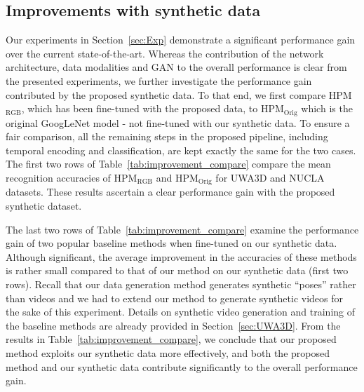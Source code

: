 \documentclass[twocolumn]{svjour3}          \smartqed  \usepackage{graphicx}
\begin{document}
\subsection{Improvements with synthetic data}
Our experiments in Section~\ref{sec:Exp} demonstrate a significant performance gain over the current state-of-the-art. Whereas the contribution of the network architecture, data modalities and GAN to the overall performance is clear from the presented experiments, we further investigate the performance gain contributed by the proposed synthetic data. To that end, we  first compare HPM$_{\mathrm{RGB}}$, which has been fine-tuned with the proposed data, to HPM$_{\mathrm{Orig}}$ which is the original GoogLeNet model  - not fine-tuned with our synthetic data. To ensure a fair comparison, all the remaining steps in the proposed pipeline, including  temporal encoding and classification, are kept exactly the same for the two cases.  The first two rows of Table~\ref{tab:improvement_compare} compare the mean recognition accuracies of  HPM$_{\mathrm{RGB}}$ and HPM$_{\mathrm{Orig}}$ for  UWA3D and NUCLA datasets. 
These results ascertain a clear performance gain with the proposed synthetic dataset.

The last two rows of Table~\ref{tab:improvement_compare} examine the performance gain of two popular  baseline methods when fine-tuned on our synthetic data. Although significant, the average  improvement in the accuracies of these methods is rather small compared to that of our method on our synthetic data (first two rows). Recall that our data generation method generates synthetic ``poses'' rather than videos and we had to extend our method to generate synthetic videos for the sake of this experiment. 
Details on synthetic video generation and training of the baseline methods are already provided in Section~\ref{sec:UWA3D}. 
From the results in Table~\ref{tab:improvement_compare}, we conclude that our proposed method exploits our synthetic data more effectively, and both the proposed method and our synthetic data contribute significantly to the overall performance gain.
\end{document}

